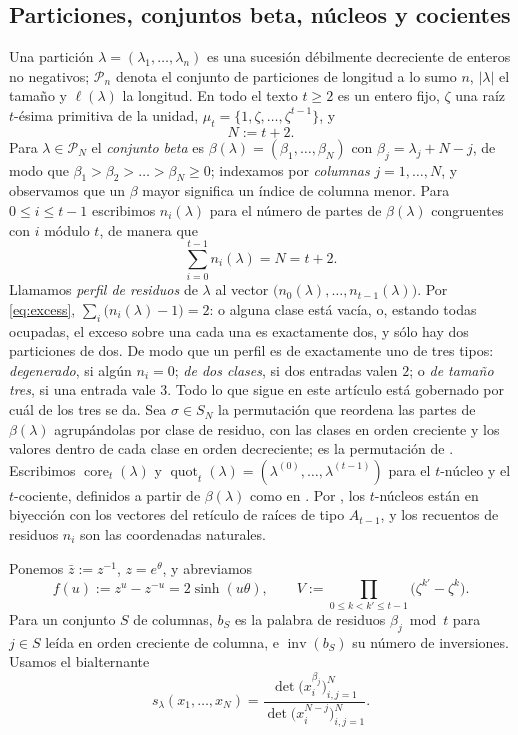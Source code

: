 \documentclass[11pt,reqno]{amsart}
\theoremstyle{plain}
\theoremstyle{definition}
\newcommand{\PP}{\mathcal{P}}
\newcommand{\zt}{\mu_t}
\newcommand{\inv}{\operatorname{inv}}
\newcommand{\core}{\operatorname{core}}
\newcommand{\quot}{\operatorname{quot}}
\newcommand{\zb}{\bar z}
\begin{document}
\subsection{Particiones, conjuntos beta, núcleos y cocientes}
Una partición $\lambda=(\lambda_1,\dots,\lambda_n)$ es una sucesión débilmente decreciente de enteros
no negativos; $\PP_n$ denota el conjunto de particiones de longitud a lo sumo $n$, $|\lambda|$ el
tamaño y $\ell(\lambda)$ la longitud. En todo el texto $t\ge2$ es un entero fijo, $\zeta$ una raíz
$t$-ésima primitiva de la unidad, $\zt=\{1,\zeta,\dots,\zeta^{t-1}\}$, y
\[
N:=t+2 .
\]
Para $\lambda\in\PP_N$ el \emph{conjunto beta} es $\beta(\lambda)=(\beta_1,\dots,\beta_N)$ con
$\beta_j=\lambda_j+N-j$, de modo que $\beta_1>\beta_2>\dots>\beta_N\ge0$; indexamos por
\emph{columnas} $j=1,\dots,N$, y observamos que un $\beta$ mayor significa un índice de columna menor.
Para $0\le i\le t-1$ escribimos $n_i(\lambda)$ para el número de partes de $\beta(\lambda)$
congruentes con $i$ módulo $t$, de manera que
\begin{equation}\label{eq:excess}
\sum_{i=0}^{t-1}n_i(\lambda)=N=t+2 .
\end{equation}
Llamamos \emph{perfil de residuos} de $\lambda$ al vector
$\bigl(n_0(\lambda),\dots,n_{t-1}(\lambda)\bigr)$. Por \eqref{eq:excess},
$\sum_i\bigl(n_i(\lambda)-1\bigr)=2$: o alguna clase está vacía, o, estando todas ocupadas, el
exceso sobre una cada una es exactamente dos, y sólo hay dos particiones de dos. De modo que un
perfil es de exactamente uno de tres tipos: \emph{degenerado}, si algún $n_i=0$; \emph{de dos
clases}, si dos entradas valen $2$; o \emph{de tamaño tres}, si una entrada vale $3$. Todo lo que
sigue en este artículo está gobernado por cuál de los tres se da.
Sea $\sigma\in S_N$ la permutación que reordena las partes de $\beta(\lambda)$ agrupándolas por clase
de residuo, con las clases en orden creciente y los valores dentro de cada clase en orden
decreciente; es la permutación de \cite[(2.1)]{AK25}. Escribimos $\core_t(\lambda)$ y
$\quot_t(\lambda)=(\lambda^{(0)},\dots,\lambda^{(t-1)})$ para el $t$-núcleo y el $t$-cociente,
definidos a partir de $\beta(\lambda)$ como en \cite[\S2.1]{AK25}. Por \cite{GKS90}, los $t$-núcleos
están en biyección con los vectores del retículo de raíces de tipo $A_{t-1}$, y los recuentos de
residuos $n_i$ son las coordenadas naturales.

Ponemos $\zb:=z^{-1}$, $z=e^{\theta}$, y abreviamos
\[
f(u):=z^{u}-z^{-u}=2\sinh(u\theta),\qquad
V:=\prod_{0\le k<k'\le t-1}\bigl(\zeta^{k'}-\zeta^{k}\bigr).
\]
Para un conjunto $S$ de columnas, $b_S$ es la palabra de residuos $\beta_j\bmod t$ para $j\in S$
leída en orden creciente de columna, e $\inv(b_S)$ su número de inversiones. Usamos el bialternante
\[
s_\lambda(x_1,\dots,x_N)=\frac{\det\bigl(x_i^{\beta_j}\bigr)_{i,j=1}^N}
{\det\bigl(x_i^{N-j}\bigr)_{i,j=1}^N}.
\]
\end{document}
